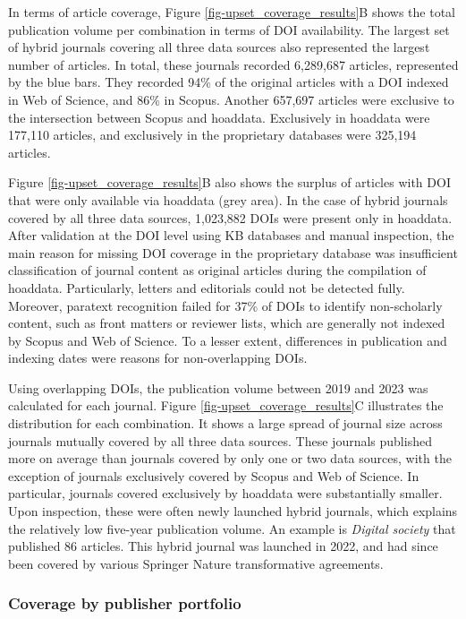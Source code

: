 \documentclass[a4paper,man,floatsintext,longtable,noextraspace,10pt]{apa6}
\begin{document}
In terms of article coverage, Figure \ref{fig-upset_coverage_results}B
shows the total publication volume per combination in terms of DOI
availability. The largest set of hybrid journals covering all three data
sources also represented the largest number of articles. In total, these
journals recorded 6,289,687 articles, represented by the blue bars. They
recorded 94\% of the original articles with a DOI indexed in Web of
Science, and 86\% in Scopus. Another 657,697 articles were exclusive to
the intersection between Scopus and hoaddata. Exclusively in hoaddata
were 177,110 articles, and exclusively in the proprietary databases were
325,194 articles.

Figure \ref{fig-upset_coverage_results}B also shows the surplus of
articles with DOI that were only available via hoaddata (grey area). In
the case of hybrid journals covered by all three data sources, 1,023,882
DOIs were present only in hoaddata. After validation at the DOI level
using KB databases and manual inspection, the main reason for missing
DOI coverage in the proprietary database was insufficient classification
of journal content as original articles during the compilation of
hoaddata. Particularly, letters and editorials could not be detected
fully. Moreover, paratext recognition failed for 37\% of DOIs to
identify non-scholarly content, such as front matters or reviewer lists,
which are generally not indexed by Scopus and Web of Science. To a
lesser extent, differences in publication and indexing dates were
reasons for non-overlapping DOIs.

Using overlapping DOIs, the publication volume between 2019 and 2023 was
calculated for each journal. Figure \ref{fig-upset_coverage_results}C
illustrates the distribution for each combination. It shows a large
spread of journal size across journals mutually covered by all three
data sources. These journals published more on average than journals
covered by only one or two data sources, with the exception of journals
exclusively covered by Scopus and Web of Science. In particular,
journals covered exclusively by hoaddata were substantially smaller.
Upon inspection, these were often newly launched hybrid journals, which
explains the relatively low five-year publication volume. An example is
\emph{Digital society} that published 86 articles. This hybrid journal
was launched in 2022, and had since been covered by various Springer
Nature transformative agreements.

\subsubsection{Coverage by publisher
portfolio}\label{coverage-by-publisher-portfolio}
\end{document}
